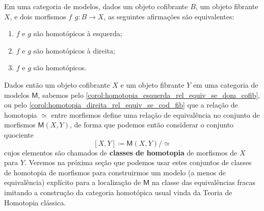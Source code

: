 \begin{corol}\label{corol:homotopias_coincidem_se_dom_cofib_cod_fib}
  Em uma categoria de modelos, dados um objeto cofibrante $B$, um objeto fibrante $X$, e dois morfismos $f\,\ g: B \to X$, as seguintes afirmações são equivalentes:
  \begin{enumerate}
  \item $f$ e $g$ são homotópicos à esquerda;
    
  \item $f$ e $g$ são homotópicos à direita;
    
  \item $f$ e $g$ são homotópicos.
  \end{enumerate}
\end{corol}

Dados então um objeto cofibrante $X$ e um objeto fibrante $Y$ em uma categoria de modelos $\mathsf{M}$, sabemos pelo  \cref{corol:homotopia_esquerda_rel_equiv_se_dom_cofib}, ou pelo \cref{corol:homotopia_direita_rel_equiv_se_cod_fib} que a relação de homotopia $\simeq$ entre morfismos define uma relação de equivalência no conjunto de morfismos $\mathsf{M}(X,Y)$, de forma que podemos então considerar o conjunto quociente
\begin{equation}
  \label{eq:conjunto_classes_homotopia}
  [X,Y] \coloneqq \mathsf{M}(X,Y)/\simeq
\end{equation}
cujos elementos são chamados de \textbf{classes de homotopia} de morfismos de $X$ para $Y$.
Veremos na próxima seção que podemos usar estes conjuntos de classes de homotopia de morfismos para construirmos um modelo (a menos de equivalência) explícito para a localização de $\mathsf{M}$ na classe das equivalências fracas imitando a construção da categoria homotópica usual vinda da Teoria de Homotopia clássica.

